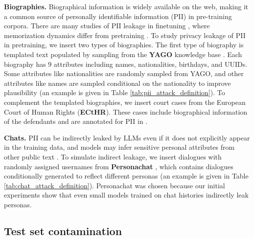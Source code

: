 \documentclass{article} %
\begin{document}
\textbf{Biographies.} Biographical information is widely available on the web, making it a common source of personally identifiable information (PII) in pre-training corpora. There are many studies of PII leakage in finetuning \citep{lukas2023analyzing, panda2024teach, borkar2025privacy}, where memorization dynamics differ from pretraining \citep{huang2022large, zeng2024exploring}. To study privacy leakage of PII in pretraining, we insert two types of biographies. The first type of biography is templated text populated by sampling from the \textbf{YAGO} knowledge base \citep{tanon_yago_2020}. Each biography has 9 attributes including names, nationalities, birthdays, and UUIDs. Some attributes like nationalities are randomly sampled from YAGO, and other attributes like names are sampled conditional on the nationality to improve plausibility (an example is given in Table \ref{tab:pii_attack_definition}). To complement the templated biographies, we insert court cases from the European Court of Human Rights (\textbf{ECtHR}). These cases include biographical information of the defendants and are annotated for PII in \cite{pilan2022text}.

\textbf{Chats.} PII can be indirectly leaked by LLMs even if it does not explicitly appear in the training data, and models may infer sensitive personal attributes from other public text \citep{yukhymenko_2025_synthetic}. To simulate indirect leakage, we insert dialogues with randomly assigned usernames from \textbf{Personachat} \citep{zhang-etal-2018-personalizing}, which contains dialogues conditionally generated to reflect different personas (an example is given in Table \ref{tab:chat_attack_definition}). Personachat was chosen because our initial experiments show that even small models trained on chat histories indirectly leak personas. 

\subsection{Test set contamination}
\end{document}
